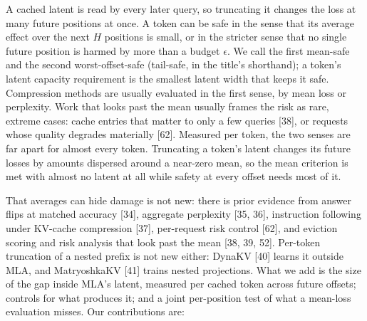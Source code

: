 \documentclass[10pt]{article}
\begin{document}
A cached latent is read by every later query, so truncating it changes the loss at many future positions at once. A token can be safe in the sense that its average effect over the next $H$ positions is small, or in the stricter sense that no single future position is harmed by more than a budget $\epsilon$. We call the first mean-safe and the second worst-offset-safe (tail-safe, in the title's shorthand); a token's latent capacity requirement is the smallest latent width that keeps it safe. Compression methods are usually evaluated in the first sense, by mean loss or perplexity. Work that looks past the mean usually frames the risk as rare, extreme cases: cache entries that matter to only a few queries [38], or requests whose quality degrades materially [62]. Measured per token, the two senses are far apart for almost every token. Truncating a token's latent changes its future losses by amounts dispersed around a near-zero mean, so the mean criterion is met with almost no latent at all while safety at every offset needs most of it.

That averages can hide damage is not new: there is prior evidence from answer flips at matched accuracy [34], aggregate perplexity [35, 36], instruction following under KV-cache compression [37], per-request risk control [62], and eviction scoring and risk analysis that look past the mean [38, 39, 52]. Per-token truncation of a nested prefix is not new either: DynaKV [40] learns it outside MLA, and MatryoshkaKV [41] trains nested projections. What we add is the size of the gap inside MLA's latent, measured per cached token across future offsets; controls for what produces it; and a joint per-position test of what a mean-loss evaluation misses. Our contributions are:
\end{document}
